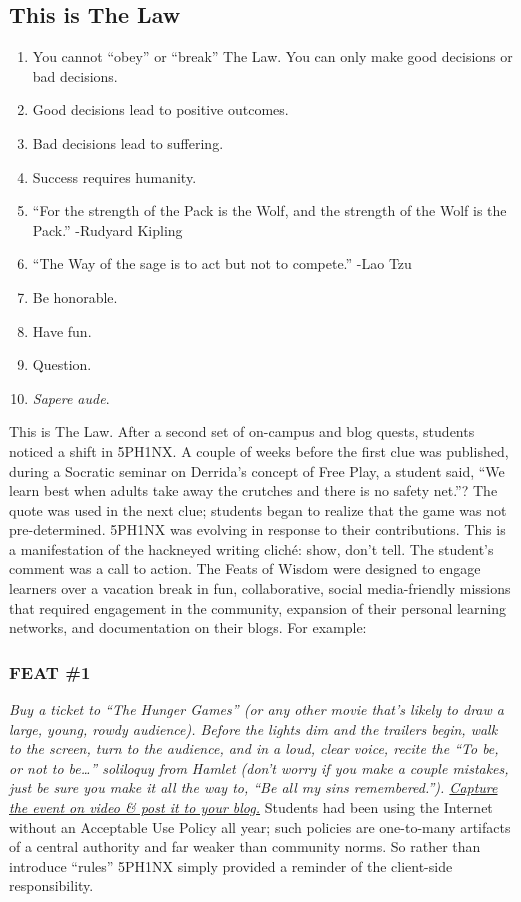 \subsection{This is The Law}

\begin{enumerate}[itemsep=0pt]
\item
  You cannot ``obey'' or ``break'' The Law. You can only make good
  decisions or bad decisions.
\item
  Good decisions lead to positive outcomes.
\item
  Bad decisions lead to suffering.
\item
  Success requires humanity.
\item
  ``For the strength of the Pack is the Wolf, and the strength of the
  Wolf is the Pack.'' -Rudyard Kipling
\item
  ``The Way of the sage is to act but not to compete.'' -Lao Tzu
\item
  Be honorable.
\item
  Have fun.
\item
  Question.
\item
  \emph{Sapere aude}.
\end{enumerate}
This is The Law. After a second set of on-campus and blog quests,
students noticed a shift in 5PH1NX. A couple of weeks before the first
clue was published, during a Socratic seminar on Derrida's concept of
Free Play, a student said, ``We learn best when adults take away the
crutches and there is no safety net.''? The quote was used in the next
clue; students began to realize that the game was not pre-determined.
5PH1NX was evolving in response to their contributions. This is a
manifestation of the hackneyed writing cliché: show, don't tell. The
student's comment was a call to action. The Feats of Wisdom were
designed to engage learners over a vacation break in fun, collaborative,
social media-friendly missions that required engagement in the
community, expansion of their personal learning networks, and
documentation on their blogs. For example:

\subsubsection{FEAT \#1}

\emph{Buy a ticket to ``The Hunger Games'' (or any other movie that's
likely to draw a large, young, rowdy audience). Before the lights dim
and the trailers begin, walk to the screen, turn to the audience, and in
a loud, clear voice, recite the ``To be, or not to be\ldots{}''
soliloquy from Hamlet (don't worry if you make a couple mistakes, just
be sure you make it all the way to, ``Be all my sins remembered.'').
\href{http://alarhsenglitcomp.blogspot.com/2012/12/feats-of-wisdom-1\_15.html}{Capture
the event on video \& post it to your blog.}} Students had been using
the Internet without an Acceptable Use Policy all year; such policies
are one-to-many artifacts of a central authority and far weaker than
community norms. So rather than introduce ``rules'' 5PH1NX simply
provided a reminder of the client-side responsibility.

